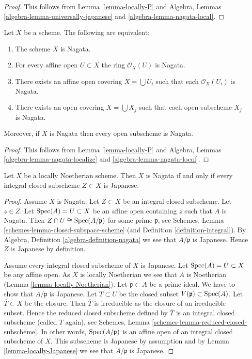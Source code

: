 \begin{proof}
This follows from Lemma \ref{lemma-locally-P} and
Algebra, Lemmas \ref{algebra-lemma-universally-japanese} and
\ref{algebra-lemma-nagata-local}.
\end{proof}

\begin{lemma}
\label{lemma-locally-nagata}
Let $X$ be a scheme. The following are equivalent:
\begin{enumerate}
\item The scheme $X$ is Nagata.
\item For every affine open $U \subset X$ the ring $\mathcal{O}_X(U)$
is Nagata.
\item There exists an affine open covering $X = \bigcup U_i$
such that each $\mathcal{O}_X(U_i)$ is Nagata.
\item There exists an open covering $X = \bigcup X_j$
such that each open subscheme $X_j$ is Nagata.
\end{enumerate}
Moreover, if $X$ is Nagata then every open subscheme is Nagata.
\end{lemma}

\begin{proof}
This follows from Lemma \ref{lemma-locally-P} and
Algebra, Lemmas \ref{algebra-lemma-nagata-localize} and
\ref{algebra-lemma-nagata-local}.
\end{proof}

\begin{lemma}
\label{lemma-characterize-nagata}
Let $X$ be a locally Noetherian scheme.
Then $X$ is Nagata if and only if every integral closed subscheme
$Z \subset X$ is Japanese.
\end{lemma}

\begin{proof}
Assume $X$ is Nagata. Let $Z \subset X$ be an integral closed subscheme.
Let $z \in Z$.
Let $\mathop{\mathrm{Spec}}(A) = U \subset X$ be an affine open containing $z$
such that $A$ is Nagata. Then
$Z \cap U \cong \mathop{\mathrm{Spec}}(A/\mathfrak p)$ for some prime $\mathfrak p$,
see Schemes, Lemma \ref{schemes-lemma-closed-subspace-scheme} (and
Definition \ref{definition-integral}). By
Algebra, Definition \ref{algebra-definition-nagata} we see
that $A/\mathfrak p$ is Japanese. Hence $Z$ is Japanese by definition.

\medskip\noindent
Assume every integral closed subscheme of $X$ is Japanese.
Let $\mathop{\mathrm{Spec}}(A) = U \subset X$ be any affine open.
As $X$ is locally Noetherian we see that $A$ is Noetherian
(Lemma \ref{lemma-locally-Noetherian}). Let $\mathfrak p \subset A$
be a prime ideal. We have to show that $A/\mathfrak p$ is Japanese.
Let $T \subset U$ be the closed subset $V(\mathfrak p) \subset \mathop{\mathrm{Spec}}(A)$.
Let $\overline{T} \subset X$ be the closure. Then $\overline{T}$ is
irreducible as the closure of an irreducible subset. Hence the reduced
closed subscheme defined by $\overline{T}$ is an integral closed
subscheme (called $\overline{T}$ again), see
Schemes, Lemma \ref{schemes-lemma-reduced-closed-subscheme}.
In other words, $\mathop{\mathrm{Spec}}(A/\mathfrak p)$ is an affine
open of an integral closed subscheme of $X$. This subscheme is Japanese
by assumption and by Lemma \ref{lemma-locally-Japanese} we see that
$A/\mathfrak p$ is Japanese.
\end{proof}

